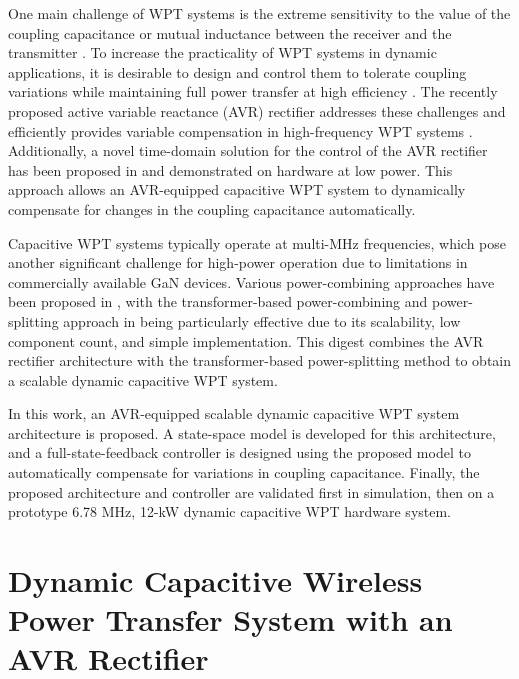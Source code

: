 \documentclass[conference, twocolumn, letterpaper]{IEEEtran}
\begin{document}
One main challenge of WPT systems is the extreme sensitivity to the value of the coupling capacitance or mutual inductance between the receiver and the transmitter \cite{2011_Budhia_Journal}. To increase the practicality of WPT systems in dynamic applications, it is desirable to design and control them to tolerate coupling variations while maintaining full power transfer at high efficiency \cite{2014_Lim_Journal, 2013_Beh_Journal, 2019_Choi_Journal, 2017_Kamineni_Journal}. The recently proposed active variable reactance (AVR) rectifier addresses these challenges and efficiently provides variable compensation in high-frequency WPT systems \cite{2019_Sinha_Journal}. Additionally, a novel time-domain solution for the control of the AVR rectifier has been proposed in \cite{2025_Liao_COMPEL} and demonstrated on hardware at low power. This approach allows an AVR-equipped capacitive WPT system to dynamically compensate for changes in the coupling capacitance automatically.

Capacitive WPT systems typically operate at multi-MHz frequencies, which pose another significant challenge for high-power operation due to limitations in commercially available GaN devices. Various power-combining approaches have been proposed in \cite{2022_Surakitbovorn_Journal, 2025_Etta_APEC}, with the transformer-based power-combining and power-splitting approach in \cite{2025_Etta_APEC} being particularly effective due to its scalability, low component count, and simple implementation. This digest combines the AVR rectifier architecture \cite{2019_Sinha_Journal} with the transformer-based power-splitting method \cite{2025_Etta_APEC} to obtain a scalable dynamic capacitive WPT system.

In this work, an AVR-equipped scalable dynamic capacitive WPT system architecture is proposed. A state-space model is developed for this architecture, and a full-state-feedback controller is designed using the proposed model to automatically compensate for variations in coupling capacitance. Finally, the proposed architecture and controller are validated first in simulation, then on a prototype 6.78 MHz, 12-kW dynamic capacitive WPT hardware system.

\vspace{0.5cm}

\section{Dynamic Capacitive Wireless Power Transfer System with an AVR Rectifier}
\label{sec:system}
\end{document}
